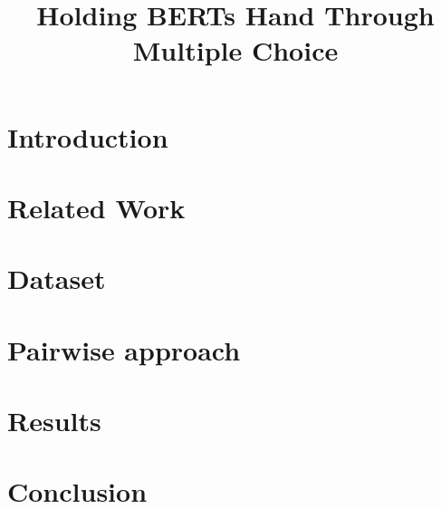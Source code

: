 \documentclass[10pt, a4paper]{article}
\title{Holding BERTs Hand Through Multiple Choice}
\begin{document}
\maketitleabstract

\section{Introduction} \label{intro}


\section{Related Work}
 \label{related-work}

\section{Dataset} \label{dataset}


\section{Pairwise approach} \label{approach}


\section{Results} \label{results}


\section{Conclusion}
 \label{conclusion}


 
\end{document}
